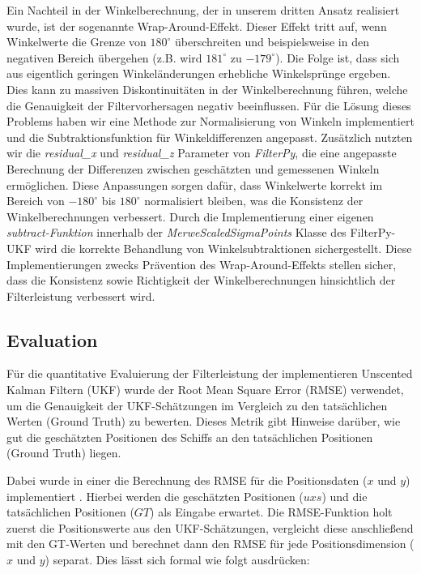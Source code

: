 \documentclass[conference]{IEEEtran}[10pt]
\begin{document}
Ein Nachteil in der Winkelberechnung, der in unserem dritten Ansatz realisiert wurde, ist der sogenannte Wrap-Around-Effekt. Dieser Effekt tritt auf, wenn Winkelwerte die Grenze von \(180^\circ\) überschreiten und beispielsweise in den negativen Bereich übergehen (z.B. wird \(181^\circ\) zu \(-179^\circ\)). Die Folge ist, dass sich aus eigentlich geringen Winkeländerungen erhebliche Winkelsprünge ergeben. Dies kann zu massiven Diskontinuitäten in der Winkelberechnung führen, welche die Genauigkeit der Filtervorhersagen negativ beeinflussen.
Für die Lösung dieses Problems haben wir eine Methode zur Normalisierung von Winkeln implementiert und die Subtraktionsfunktion für Winkeldifferenzen angepasst. Zusätzlich nutzten wir die \textit{residual\_x} und \textit{residual\_z} Parameter von \textit{FilterPy}, die eine angepasste Berechnung der Differenzen zwischen geschätzten und gemessenen Winkeln ermöglichen. Diese Anpassungen sorgen dafür, dass Winkelwerte korrekt im Bereich von \(-180^\circ\) bis \(180^\circ\) normalisiert bleiben, was die Konsistenz der Winkelberechnungen verbessert. Durch die Implementierung einer eigenen \textit{subtract-Funktion} innerhalb der \textit{MerweScaledSigmaPoints} Klasse des FilterPy-UKF wird die korrekte Behandlung von Winkelsubtraktionen sichergestellt. Diese Implementierungen zwecks Prävention des Wrap-Around-Effekts stellen sicher, dass die Konsistenz sowie Richtigkeit der Winkelberechnungen  hinsichtlich der Filterleistung verbessert wird.



\subsection{Evaluation}
Für die quantitative Evaluierung der Filterleistung der implementieren Unscented Kalman Filtern (UKF) wurde der Root Mean Square Error (RMSE) verwendet, um die Genauigkeit der UKF-Schätzungen im Vergleich zu den tatsächlichen Werten (Ground Truth) zu bewerten. Dieses Metrik gibt Hinweise darüber, wie gut die geschätzten Positionen des Schiffs an den tatsächlichen Positionen (Ground Truth) liegen.

Dabei wurde in einer die Berechnung des RMSE für die Positionsdaten (\(x\) und \(y\)) implementiert . Hierbei werden die geschätzten Positionen (\(uxs\)) und die tatsächlichen Positionen (\(GT\)) als Eingabe erwartet. Die RMSE-Funktion holt zuerst die Positionswerte aus den UKF-Schätzungen, vergleicht diese anschließend mit den GT-Werten und berechnet dann den RMSE für jede Positionsdimension (\(x\) und \(y\)) separat. Dies lässt sich formal wie folgt ausdrücken:
\end{document}
